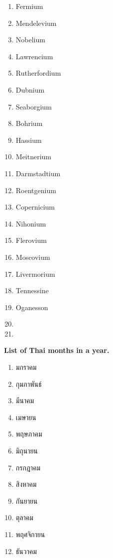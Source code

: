 \begin{enumerate}
\begin{multicols}{3}
\begin{enumerate}[label={\thaialphs*.},start=62]
        \item Fermium
        \item Mendelevium
        \item Nobelium
        \item Lawrencium
        \item Rutherfordium
        \item Dubnium
        \item Seaborgium
        \item Bohrium
        \item Hassium
        \item Meitnerium
        \item Darmstadtium
        \item Roentgenium
        \item Copernicium
        \item Nihonium
        \item Flerovium
        \item Moscovium
        \item Livermorium
        \item Tennessine
        \item Oganesson
        \item[] \phantom{x}
        \item[] \phantom{x}
    \end{enumerate}
    \end{multicols}

    \textbf{List of Thai months in a year.}
    \begin{enumerate}[label={\thainum*.}]
        \item มกราคม
        \item กุมภาพันธ์
        \item มีนาคม
        \item เมษายน
        \item พฤษภาคม
        \item มิถุนายน
        \item กรกฎาคม
        \item สิงหาคม
        \item กันยายน
        \item ตุลาคม
        \item พฤศจิกายน
        \item ธันวาคม
    \end{enumerate}

\end{enumerate}
